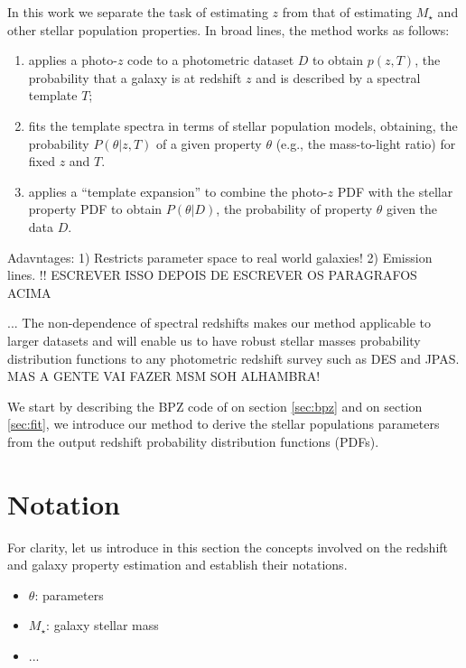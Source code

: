 \documentclass[9pt]{memoir}
\begin{document}
In this work we separate the task of estimating $z$ from that of estimating  $M_\star$ and other stellar population properties. In broad lines, the method works as follows:

\begin{enumerate}

\item applies a photo-$z$ code to a photometric dataset $D$ to obtain $p(z,T)$, the probability that a galaxy is at redshift $z$ and is described by a spectral template $T$;

\item fits the template spectra in terms of stellar population models, obtaining, the probability $P(\theta|z,T)$ of a given property $\theta$ (e.g., the mass-to-light ratio) for fixed $z$ and $T$.

\item applies a ``template expansion'' to combine the photo-$z$ PDF with the stellar property PDF to obtain $P(\theta|D)$, the probability of property $\theta$ given the data $D$.


\end{enumerate}


Adavntages: 1) Restricts parameter space to real world galaxies! 2) Emission lines. !! ESCREVER ISSO DEPOIS DE ESCREVER OS PARAGRAFOS ACIMA

...
The non-dependence of spectral redshifts makes our method applicable to larger datasets and will enable us to have robust stellar masses probability distribution functions to any photometric redshift survey such as DES and JPAS. MAS A GENTE VAI FAZER MSM SOH ALHAMBRA!



We start by describing the BPZ code of \cite{Benitez.2000a} on section \ref{sec:bpz} and on section \ref{sec:fit}, we introduce our method to derive the stellar populations parameters from the output redshift probability distribution functions (PDFs).

\section{Notation}
\label{sec:notation}

For clarity, let us introduce in this section the concepts involved on the redshift and galaxy property estimation and establish their notations.

\begin{itemize}
\item $\theta$: parameters
\item $M_\star$: galaxy stellar mass

\item ...

\end{itemize}
\end{document}
